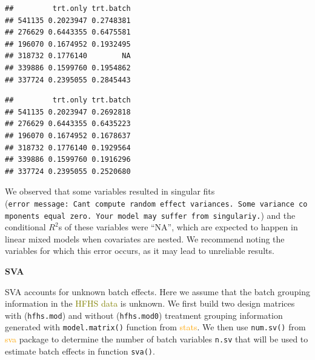 \documentclass[
]{book}
\newenvironment{Shaded}{\begin{snugshade}}{\end{snugshade}}
\newcommand{\FunctionTok}[1]{\textcolor[rgb]{0.00,0.00,0.00}{#1}}
\newcommand{\NormalTok}[1]{#1}
\newcommand{\SpecialCharTok}[1]{\textcolor[rgb]{0.00,0.00,0.00}{#1}}
\begin{document}
\begin{Shaded}
\end{Shaded}

\begin{verbatim}
##         trt.only trt.batch
## 541135 0.2023947 0.2748381
## 276629 0.6443355 0.6475581
## 196070 0.1674952 0.1932495
## 318732 0.1776140        NA
## 339886 0.1599760 0.1954862
## 337724 0.2395055 0.2845443
\end{verbatim}

\begin{Shaded}
\end{Shaded}

\begin{verbatim}
##         trt.only trt.batch
## 541135 0.2023947 0.2692818
## 276629 0.6443355 0.6435223
## 196070 0.1674952 0.1678637
## 318732 0.1776140 0.1929564
## 339886 0.1599760 0.1916296
## 337724 0.2395055 0.2520680
\end{verbatim}

We observed that some variables resulted in singular fits (\texttt{error\ message:\ Can\textquotesingle{}t\ compute\ random\ effect\ variances.\ Some\ variance\ components\ equal\ zero.\ Your\ model\ may\ suffer\ from\ singulariy.}) and the conditional \(R^2\)s of these variables were ``NA'', which are expected to happen in linear mixed models when covariates are nested. We recommend noting the variables for which this error occurs, as it may lead to unreliable results.

\textbf{SVA}

SVA accounts for unknown batch effects. Here we assume that the batch grouping information in the \textcolor{olive}{HFHS data} is unknown. We first build two design matrices with (\texttt{hfhs.mod}) and without (\texttt{hfhs.mod0}) treatment grouping information generated with \texttt{model.matrix()} function from \textcolor{orange}{stats}. We then use \texttt{num.sv()} from \textcolor{orange}{sva} package to determine the number of batch variables \texttt{n.sv} that will be used to estimate batch effects in function \texttt{sva()}.
\end{document}
